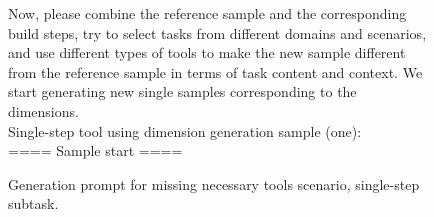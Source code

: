 \begin{figure}[!htb]
\begin{tcolorbox}[
    colback=white, 
    colframe=blue1, 
    boxrule=0.5mm,
    arc=0mm,
    outer arc=0mm,
    title=Missing Necessary Tools: Single-step - Generation Prompt]
Now, please combine the reference sample and the corresponding build steps, try to select tasks from different domains and scenarios, and use different types of tools to make the new sample different from the reference sample in terms of task content and context. We start generating new single samples corresponding to the dimensions.\\
Single-step tool using dimension generation sample (one):\\
==== Sample start ====
\end{tcolorbox}
\caption{Generation prompt for missing necessary tools scenario, single-step subtask.}
\label{fig:single-step-prompt}
\end{figure}